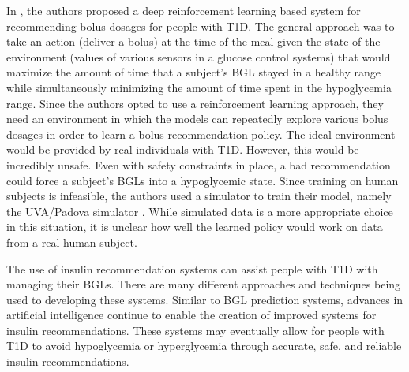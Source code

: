 In \cite{zhu:bolus_drl}, the authors proposed a deep reinforcement learning based system for recommending bolus dosages for people with \ac{T1D}. The general approach was to take an action (deliver a bolus) at the time of the meal given the state of the environment (values of various sensors in a glucose control systems) that would maximize the amount of time that a subject’s \ac{BGL} stayed in a healthy range while simultaneously minimizing the amount of time spent in the hypoglycemia range. Since the authors opted to use a reinforcement learning approach, they need an environment in which the models can repeatedly explore various bolus dosages in order to learn a bolus recommendation policy. The ideal environment would be provided by real individuals with \ac{T1D}. However, this would be incredibly unsafe. Even with safety constraints in place, a bad recommendation could force a subject's \ac{BGLs} into a hypoglycemic state. Since training on human subjects is infeasible, the authors used a simulator to train their model, namely the UVA/Padova simulator \cite{dalla_man:simulator}. While simulated data is a more appropriate choice in this situation, it is unclear how well the learned policy would work on data from a real human subject.

The use of insulin recommendation systems can assist people with \ac{T1D} with managing their \ac{BGLs}. There are many different approaches and techniques being used to developing these systems. Similar to \ac{BGL} prediction systems, advances in artificial intelligence continue to enable the creation of improved systems for insulin recommendations. These systems may eventually allow for people with \ac{T1D} to avoid hypoglycemia or hyperglycemia through accurate, safe, and reliable insulin recommendations.


